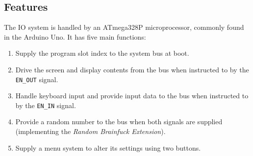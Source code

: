 \subsection{Features}
The IO system is handled by an ATmega328P microprocessor, commonly found in the Arduino Uno. It has five main functions:
\begin{enumerate}
\item Supply the program slot index to the system bus at boot.
\item Drive the screen and display contents from the bus when instructed to by the \texttt{EN\_OUT} signal.
\item Handle keyboard input and provide input data to the bus when instructed to by the \texttt{EN\_IN} signal.
\item Provide a random number to the bus when both signals are supplied (implementing the \emph{Random Brainfuck Extension}).
\item Supply a menu system to alter its settings using two buttons.
\end{enumerate}

